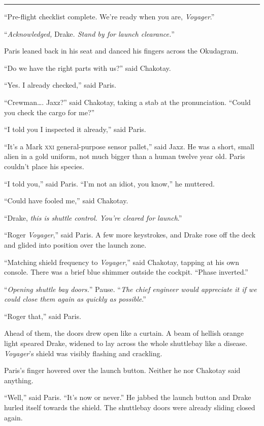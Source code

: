 \documentclass[twoside,letterpaper,12pt]{memoir}
\begin{document}
\fancybreak{\rule{3cm}{0.4 pt}}
``Pre-flight checklist complete. We're ready when you are, \textit{Voyager}.''

``\textit{Acknowledged, }Drake\textit{. Stand by for launch clearance.}''

Paris leaned back in his seat and danced his fingers across the Okudagram.

``Do we have the right parts with us?'' said Chakotay.

``Yes. I already checked,'' said Paris.

``Crewman\ldots . Jaxz?'' said Chakotay, taking a stab at the pronunciation. ``Could you check the cargo for me?''

``I told you I inspected it already,'' said Paris.

``It's a Mark \textsc{xxi} general-purpose sensor pallet,'' said Jaxz. He was a short, small alien in a gold uniform, not much bigger than a human twelve year old. Paris couldn't place his species.

``I told you,'' said Paris. ``I'm not an idiot, you know,'' he muttered.

``Could have fooled me,'' said Chakotay.

``Drake, \textit{this is shuttle control. You're cleared for launch}.''

``Roger \textit{Voyager},'' said Paris. A few more keystrokes, and Drake rose off the deck and glided into position over the launch zone.

``Matching shield frequency to \textit{Voyager},'' said Chakotay, tapping at his own console. There was a brief blue shimmer outside the cockpit. ``Phase inverted.''

``\textit{Opening shuttle bay doors.}'' Pause. ``\textit{The chief engineer would appreciate it if we could close them again as quickly as possible}.''

``Roger that,'' said Paris.

Ahead of them, the doors drew open like a curtain. A beam of hellish orange light speared Drake, widened to lay across the whole shuttlebay like a disease. \textit{Voyager}'s shield was visibly flashing and crackling.

Paris's finger hovered over the launch button. Neither he nor Chakotay said anything.

``Well,'' said Paris. ``It's now or never.'' He jabbed the launch button and Drake hurled itself towards the shield. The shuttlebay doors were already sliding closed again.
\end{document}
